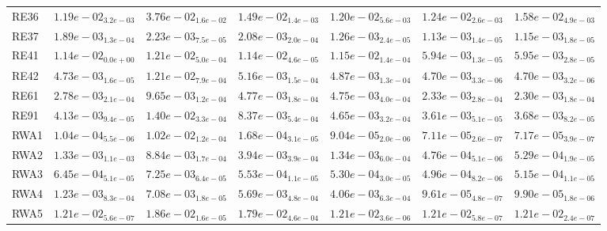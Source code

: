 \documentclass{article}
\begin{document}
\begin{table}
\begin{scriptsize}
\begin{tabular}{lllllll}
RE36 & \cellcolor{gray95}$  1.19e-02_{ 3.2e-03}$ & $  3.76e-02_{ 1.6e-02}$ & $  1.49e-02_{ 1.4e-03}$ & \cellcolor{gray25}$  1.20e-02_{ 5.6e-03}$ & $  1.24e-02_{ 2.6e-03}$ & $  1.58e-02_{ 4.9e-03}$ \\
RE37 & $  1.89e-03_{ 1.3e-04}$ & $  2.23e-03_{ 7.5e-05}$ & $  2.08e-03_{ 2.0e-04}$ & $  1.26e-03_{ 2.4e-05}$ & \cellcolor{gray95}$  1.13e-03_{ 1.4e-05}$ & \cellcolor{gray25}$  1.15e-03_{ 1.8e-05}$ \\
RE41 & $  1.14e-02_{ 0.0e+00}$ & $  1.21e-02_{ 5.0e-04}$ & $  1.14e-02_{ 4.6e-05}$ & $  1.15e-02_{ 1.4e-04}$ & \cellcolor{gray95}$  5.94e-03_{ 1.3e-05}$ & \cellcolor{gray25}$  5.95e-03_{ 2.8e-05}$ \\
RE42 & $  4.73e-03_{ 1.6e-05}$ & $  1.21e-02_{ 7.9e-04}$ & $  5.16e-03_{ 1.5e-04}$ & $  4.87e-03_{ 1.3e-04}$ & \cellcolor{gray25}$  4.70e-03_{ 3.3e-06}$ & \cellcolor{gray95}$  4.70e-03_{ 3.2e-06}$ \\
RE61 & $  2.78e-03_{ 2.1e-04}$ & $  9.65e-03_{ 1.2e-04}$ & $  4.77e-03_{ 1.8e-04}$ & $  4.75e-03_{ 4.0e-04}$ & \cellcolor{gray25}$  2.33e-03_{ 2.8e-04}$ & \cellcolor{gray95}$  2.30e-03_{ 1.8e-04}$ \\
RE91 & $  4.13e-03_{ 9.4e-05}$ & $  1.40e-02_{ 3.3e-04}$ & $  8.37e-03_{ 5.4e-04}$ & $  4.65e-03_{ 3.2e-04}$ & \cellcolor{gray95}$  3.61e-03_{ 5.1e-05}$ & \cellcolor{gray25}$  3.68e-03_{ 8.2e-05}$ \\
RWA1 & $  1.04e-04_{ 5.5e-06}$ & $  1.02e-02_{ 1.2e-04}$ & $  1.68e-04_{ 3.1e-05}$ & $  9.04e-05_{ 2.0e-06}$ & \cellcolor{gray95}$  7.11e-05_{ 2.6e-07}$ & \cellcolor{gray25}$  7.17e-05_{ 3.9e-07}$ \\
RWA2 & $  1.33e-03_{ 1.1e-03}$ & $  8.84e-03_{ 1.7e-04}$ & $  3.94e-03_{ 3.9e-04}$ & $  1.34e-03_{ 6.0e-04}$ & \cellcolor{gray95}$  4.76e-04_{ 5.1e-06}$ & \cellcolor{gray25}$  5.29e-04_{ 1.9e-05}$ \\
RWA3 & $  6.45e-04_{ 5.1e-05}$ & $  7.25e-03_{ 6.4e-05}$ & $  5.53e-04_{ 1.1e-05}$ & $  5.30e-04_{ 3.0e-05}$ & \cellcolor{gray95}$  4.96e-04_{ 8.2e-06}$ & \cellcolor{gray25}$  5.15e-04_{ 1.1e-05}$ \\
RWA4 & $  1.23e-03_{ 8.3e-04}$ & $  7.08e-03_{ 1.8e-05}$ & $  5.69e-03_{ 4.8e-04}$ & $  4.06e-03_{ 6.3e-04}$ & \cellcolor{gray95}$  9.61e-05_{ 4.8e-07}$ & \cellcolor{gray25}$  9.90e-05_{ 1.8e-06}$ \\
RWA5 & \cellcolor{gray25}$  1.21e-02_{ 5.6e-07}$ & $  1.86e-02_{ 1.6e-05}$ & $  1.79e-02_{ 4.6e-04}$ & $  1.21e-02_{ 3.6e-06}$ & $  1.21e-02_{ 5.8e-07}$ & \cellcolor{gray95}$  1.21e-02_{ 2.4e-07}$ \\

\end{tabular}
\end{scriptsize}
\end{table}
\end{document}
